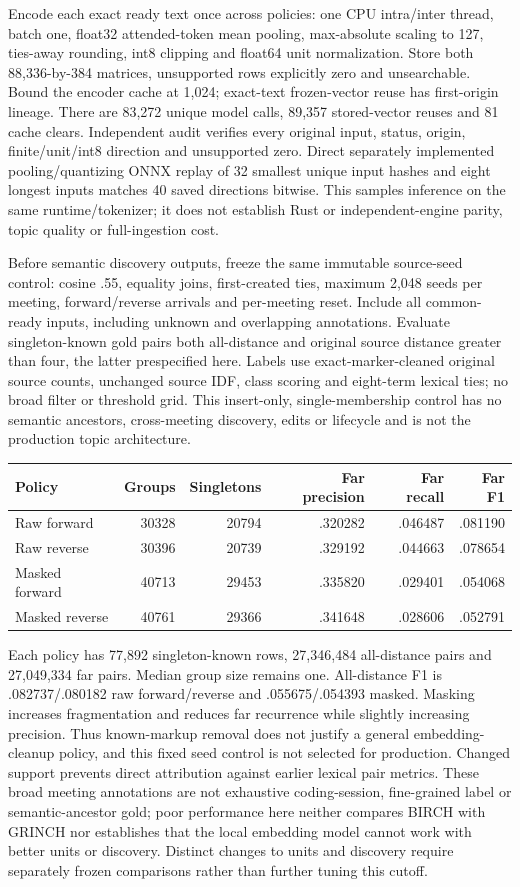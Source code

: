 \documentclass[11pt]{article}
\begin{document}
Encode each exact ready text once across policies: one CPU intra/inter thread,
batch one, float32 attended-token mean pooling, max-absolute scaling to 127,
ties-away rounding, int8 clipping and float64 unit normalization. Store both
88,336-by-384 matrices, unsupported rows explicitly zero and unsearchable.
Bound the encoder cache at 1,024; exact-text frozen-vector reuse has first-origin
lineage. There are 83,272 unique model calls, 89,357 stored-vector reuses and 81
cache clears. Independent audit verifies every original input, status, origin,
finite/unit/int8 direction and unsupported zero. Direct separately implemented
pooling/quantizing ONNX replay of 32 smallest unique input hashes and eight
longest inputs matches 40 saved directions bitwise. This samples inference on
the same runtime/tokenizer; it does not establish Rust or independent-engine
parity, topic quality or full-ingestion cost.

Before semantic discovery outputs, freeze the same immutable source-seed control:
cosine .55, equality joins, first-created ties, maximum 2,048 seeds per meeting,
forward/reverse arrivals and per-meeting reset. Include all common-ready inputs,
including unknown and overlapping annotations. Evaluate singleton-known gold
pairs both all-distance and original source distance greater than four, the
latter prespecified here. Labels use exact-marker-cleaned original source counts,
unchanged source IDF, class scoring and eight-term lexical ties; no broad filter
or threshold grid. This insert-only, single-membership control has no semantic
ancestors, cross-meeting discovery, edits or lifecycle and is not the production
topic architecture.

\begin{center}
\begin{tabular}{lrrrrr}
Policy & Groups & Singletons & Far precision & Far recall & Far F1\\\hline
Raw forward & 30328 & 20794 & .320282 & .046487 & .081190\\
Raw reverse & 30396 & 20739 & .329192 & .044663 & .078654\\
Masked forward & 40713 & 29453 & .335820 & .029401 & .054068\\
Masked reverse & 40761 & 29366 & .341648 & .028606 & .052791
\end{tabular}
\end{center}
Each policy has 77,892 singleton-known rows, 27,346,484 all-distance pairs and
27,049,334 far pairs. Median group size remains one. All-distance F1 is
.082737/.080182 raw forward/reverse and .055675/.054393 masked. Masking increases
fragmentation and reduces far recurrence while slightly increasing precision.
Thus known-markup removal does not justify a general embedding-cleanup policy,
and this fixed seed control is not selected for production. Changed support
prevents direct attribution against earlier lexical pair metrics. These broad
meeting annotations are not exhaustive coding-session, fine-grained label or
semantic-ancestor gold; poor performance here neither compares BIRCH with GRINCH
nor establishes that the local embedding model cannot work with better units or
discovery. Distinct changes to units and discovery require separately frozen
comparisons rather than further tuning this cutoff.
\end{document}
